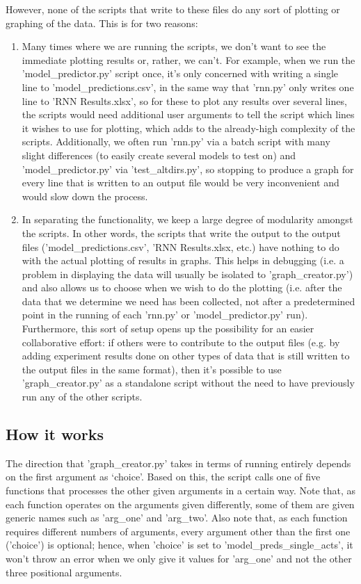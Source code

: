 \documentclass[12pt,twoside]{report}
\begin{document}
\quad However, none of the scripts that write to these files do any sort of plotting or graphing of the data. This is for two reasons:

\begin{enumerate}
	\item Many times where we are running the scripts, we don't want to see the immediate plotting results or, rather, we can't. For example, when we run the 'model\_predictor.py' script once, it's only concerned with writing a single line to 'model\_predictions.csv', in the same way that 'rnn.py' only writes one line to 'RNN Results.xlsx', so for these to plot any results over several lines, the scripts would need additional user arguments to tell the script which lines it wishes to use for plotting, which adds to the already-high complexity of the scripts. Additionally, we often run 'rnn.py' via a batch script with many slight differences (to easily create several models to test on) and 'model\_predictor.py' via 'test\_altdirs.py', so stopping to produce a graph for every line that is written to an output file would be very inconvenient and would slow down the process.
	\item In separating the functionality, we keep a large degree of modularity amongst the scripts. In other words, the scripts that write the output to the output files ('model\_predictions.csv', 'RNN Results.xlsx, etc.) have nothing to do with the actual plotting of results in graphs. This helps in debugging (i.e. a problem in displaying the data will usually be isolated to 'graph\_creator.py') and also allows us to choose when we wish to do the plotting (i.e. after the data that we determine we need has been collected, not after a predetermined point in the running of each 'rnn.py' or 'model\_predictor.py' run). Furthermore, this sort of setup opens up the possibility for an easier collaborative effort: if others were to contribute to the output files (e.g. by adding experiment results done on other types of data that is still written to the output files in the same format), then it's possible to use 'graph\_creator.py' as a standalone script without the need to have previously run any of the other scripts.
\end{enumerate}

\subsection{How it works}

\quad The direction that 'graph\_creator.py' takes in terms of running entirely depends on the first argument as ‘choice’. Based on this, the script calls one of five functions that processes the other given arguments in a certain way. Note that, as each function operates on the arguments given differently, some of them are given generic names such as 'arg\_one' and 'arg\_two'. Also note that, as each function requires different numbers of arguments, every argument other than the first one ('choice') is optional; hence, when 'choice' is set to 'model\_preds\_single\_acts', it won't throw an error when we only give it values for 'arg\_one' and not the other three positional arguments.\\
\end{document}
